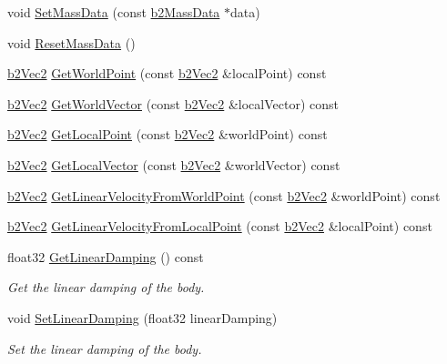 \begin{DoxyCompactItemize}
void \hyperlink{classb2Body_a58a641fedf8a81e1e26d09ec00a22fe2}{Set\+Mass\+Data} (const \hyperlink{structb2MassData}{b2\+Mass\+Data} $\ast$data)
\item 
void \hyperlink{classb2Body_a109d8567c6ae84c61fce2919fb209c63}{Reset\+Mass\+Data} ()
\item 
\hyperlink{structb2Vec2}{b2\+Vec2} \hyperlink{classb2Body_a712b782c61963c6f07beca86acc631ae}{Get\+World\+Point} (const \hyperlink{structb2Vec2}{b2\+Vec2} \&local\+Point) const
\item 
\hyperlink{structb2Vec2}{b2\+Vec2} \hyperlink{classb2Body_ae8c434785b2a730f7c385e708b345bb6}{Get\+World\+Vector} (const \hyperlink{structb2Vec2}{b2\+Vec2} \&local\+Vector) const
\item 
\hyperlink{structb2Vec2}{b2\+Vec2} \hyperlink{classb2Body_a0df8f4312ab23223489323326b2d763d}{Get\+Local\+Point} (const \hyperlink{structb2Vec2}{b2\+Vec2} \&world\+Point) const
\item 
\hyperlink{structb2Vec2}{b2\+Vec2} \hyperlink{classb2Body_aed2f88179cedf4cdbdc47429ebe41288}{Get\+Local\+Vector} (const \hyperlink{structb2Vec2}{b2\+Vec2} \&world\+Vector) const
\item 
\hyperlink{structb2Vec2}{b2\+Vec2} \hyperlink{classb2Body_a5bc9a483e5f59199daa1751786034c1d}{Get\+Linear\+Velocity\+From\+World\+Point} (const \hyperlink{structb2Vec2}{b2\+Vec2} \&world\+Point) const
\item 
\hyperlink{structb2Vec2}{b2\+Vec2} \hyperlink{classb2Body_a0ac0a4ad6ac3c7804652d9994239dcbd}{Get\+Linear\+Velocity\+From\+Local\+Point} (const \hyperlink{structb2Vec2}{b2\+Vec2} \&local\+Point) const
\item 
\mbox{\label{classb2Body_aff6bc518ea0f07fa5bba7cb7782e86d1}} 
float32 \hyperlink{classb2Body_aff6bc518ea0f07fa5bba7cb7782e86d1}{Get\+Linear\+Damping} () const
\begin{DoxyCompactList}\small\item\em Get the linear damping of the body. \end{DoxyCompactList}\item 
\mbox{\label{classb2Body_a909f9753ad700f70282a56e00bc182a5}} 
void \hyperlink{classb2Body_a909f9753ad700f70282a56e00bc182a5}{Set\+Linear\+Damping} (float32 linear\+Damping)
\begin{DoxyCompactList}\small\item\em Set the linear damping of the body. \end{DoxyCompactList}\item 

\end{DoxyCompactItemize}
